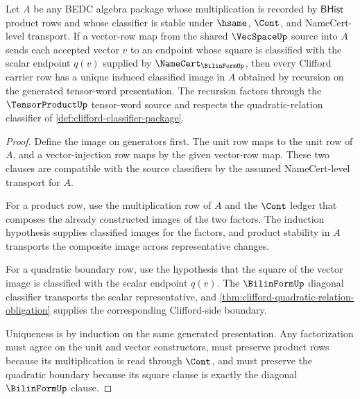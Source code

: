 \begin{theorem}
\label{thm:clifford-universal-factorization-obligation}
Let $A$ be any BEDC algebra package whose multiplication is recorded by $\mathsf{BHist}$ product rows and whose classifier is stable under $\hsame$, $\Cont$, and NameCert-level transport. If a vector-row map from the shared $\VecSpaceUp$ source into $A$ sends each accepted vector $v$ to an endpoint whose square is classified with the scalar endpoint $q(v)$ supplied by $\NameCert_{\BilinFormUp}$, then every Clifford carrier row has a unique induced classified image in $A$ obtained by recursion on the generated tensor-word presentation. The recursion factors through the $\TensorProductUp$ tensor-word source and respects the quadratic-relation classifier of \autoref{def:clifford-classifier-package}.
\end{theorem}
\begin{proof}
Define the image on generators first. The unit row maps to the unit row of $A$, and a vector-injection row maps by the given vector-row map. These two clauses are compatible with the source classifiers by the assumed NameCert-level transport for $A$.

For a product row, use the multiplication row of $A$ and the $\Cont$ ledger that composes the already constructed images of the two factors. The induction hypothesis supplies classified images for the factors, and product stability in $A$ transports the composite image across representative changes.

For a quadratic boundary row, use the hypothesis that the square of the vector image is classified with the scalar endpoint $q(v)$. The $\BilinFormUp$ diagonal classifier transports the scalar representative, and \autoref{thm:clifford-quadratic-relation-obligation} supplies the corresponding Clifford-side boundary.

Uniqueness is by induction on the same generated presentation. Any factorization must agree on the unit and vector constructors, must preserve product rows because its multiplication is read through $\Cont$, and must preserve the quadratic boundary because its square clause is exactly the diagonal $\BilinFormUp$ clause.
\end{proof}

